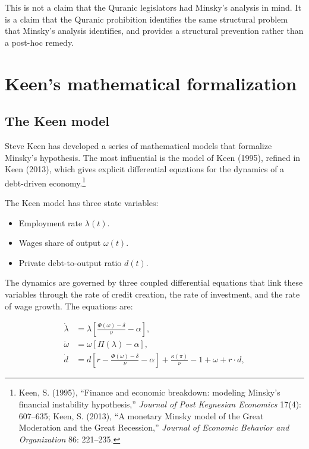 This is not a claim that the Quranic legislators had Minsky's
analysis in mind. It is a claim that the Quranic prohibition
identifies the same structural problem that Minsky's analysis
identifies, and provides a structural prevention rather than a
post-hoc remedy.

\section{Keen's mathematical formalization}
\label{sec:riba-keen}

\subsection{The Keen model}

Steve Keen has developed a series of mathematical models that
formalize Minsky's hypothesis. The most influential is the model
of Keen (1995), refined in Keen (2013), which gives explicit
differential equations for the dynamics of a debt-driven
economy.\footnote{Keen, S. (1995), ``Finance and economic breakdown:
modeling Minsky's financial instability hypothesis,''
\emph{Journal of Post Keynesian Economics} 17(4): 607--635; Keen, S.
(2013), ``A monetary Minsky model of the Great Moderation and the
Great Recession,'' \emph{Journal of Economic Behavior and
Organization} 86: 221--235.}

The Keen model has three state variables:

\begin{itemize}[leftmargin=2em]
    \item Employment rate $\lambda(t)$.
    \item Wages share of output $\omega(t)$.
    \item Private debt-to-output ratio $d(t)$.
\end{itemize}

The dynamics are governed by three coupled differential equations
that link these variables through the rate of credit creation, the
rate of investment, and the rate of wage growth. The equations
are:

\[
\begin{aligned}
\dot{\lambda} &= \lambda \left[ \frac{\Phi(\omega) - \delta}{\nu} - \alpha \right], \\
\dot{\omega} &= \omega [\Pi(\lambda) - \alpha], \\
\dot{d} &= d \left[ r - \frac{\Phi(\omega) - \delta}{\nu} - \alpha \right] + \frac{\kappa(\pi)}{\nu} - 1 + \omega + r \cdot d,
\end{aligned}
\]

